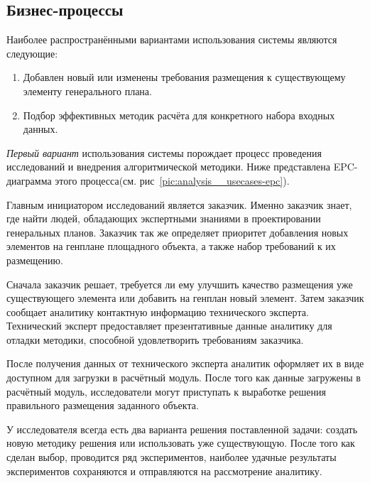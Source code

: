 \subsection{\large{Бизнес-процессы}}

Наиболее распространёнными вариантами использования системы являются следующие:
\begin{enumerate}
	\item Добавлен новый или изменены требования размещения к существующему элементу генерального плана.
	\item Подбор эффективных методик расчёта для конкретного набора входных данных.
\end{enumerate}

\textit{Первый вариант} использования системы порождает процесс проведения исследований и
внедрения алгоритмической методики.
Ниже представлена EPC-диаграмма этого процесса(см. рис\ \ref{pic:analysis__usecases-epc}).

Главным инициатором исследований является заказчик. Именно заказчик знает, где найти людей,
обладающих экспертными знаниями в проектировании генеральных планов.
Заказчик так же определяет приоритет добавления
новых элементов на генплане площадного объекта, а также набор требований к их размещению.

Сначала заказчик решает, требуется ли ему улучшить качество размещения уже существующего элемента
или добавить на генплан новый элемент. Затем заказчик сообщает аналитику контактную
информацию технического эксперта. Технический эксперт предоставляет презентативные данные аналитику для отладки методики,
способной удовлетворить требованиям заказчика.

После получения данных от технического эксперта аналитик оформляет их в виде доступном для загрузки в расчётный модуль.
После того как данные загружены в расчётный модуль, исследователи могут приступать к выработке решения
правильного размещения заданного объекта.

У исследователя всегда есть два варианта решения поставленной задачи: создать новую методику решения
или использовать уже существующую.
После того как сделан выбор, проводится ряд экспериментов,
наиболее удачные результаты экспериментов сохраняются и отправляются на рассмотрение аналитику.

